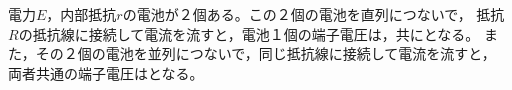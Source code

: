 \hakosyokika
\item 電力$E$，内部抵抗$r$の電池が２個ある。この２個の電池を直列につないで，
抵抗$R$の抵抗線に接続して電流を流すと，電池１個の端子電圧は，共に\Hako となる。
また，その２個の電池を並列につないで，同じ抵抗線に接続して電流を流すと，
両者共通の端子電圧は\Hako となる。 